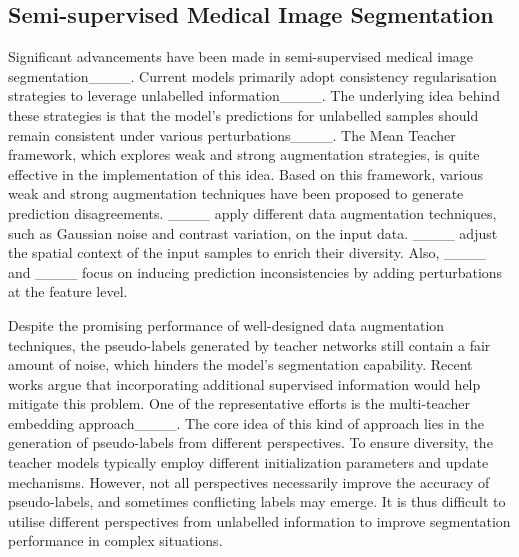 \subsection{Semi-supervised Medical Image Segmentation}

Significant advancements have been made in semi-supervised medical image segmentation____. Current models primarily adopt consistency regularisation strategies to leverage unlabelled information____. The underlying idea behind these strategies is that the model's predictions for unlabelled samples should remain consistent under various perturbations____. The Mean Teacher framework, which explores weak and strong augmentation strategies, is quite effective in the implementation of this idea. Based on this framework, various weak and strong augmentation techniques have been proposed to generate prediction disagreements. ____ apply different data augmentation techniques, such as Gaussian noise and contrast variation, on the input data. ____ adjust the spatial context of the input samples to enrich their diversity. Also, ____ and ____ focus on inducing prediction inconsistencies by adding perturbations at the feature level.


Despite the promising performance of well-designed data augmentation techniques, the pseudo-labels generated by teacher networks still contain a fair amount of noise, which hinders the model's segmentation capability. Recent works argue that incorporating additional supervised information would help mitigate this problem. One of the representative efforts is the multi-teacher embedding approach____. The core idea of this kind of approach lies in the generation of pseudo-labels from different perspectives. To ensure diversity, the teacher models typically employ different initialization parameters and update mechanisms. However, not all perspectives necessarily improve the accuracy of pseudo-labels, and sometimes conflicting labels may emerge. It is thus difficult to utilise different perspectives from unlabelled information to improve segmentation performance in complex situations. 

